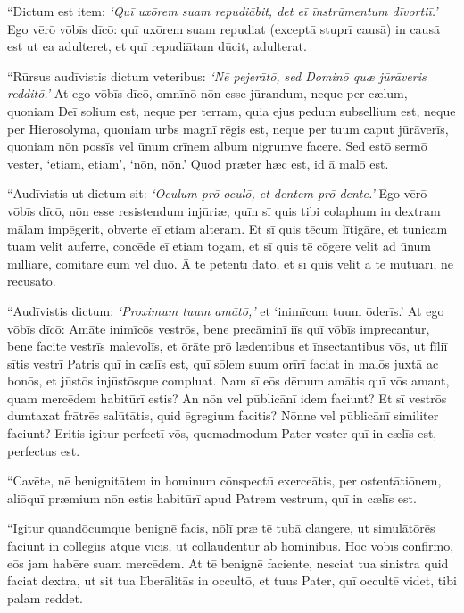 \Versus ``Dictum est item: \emph{`Quī uxōrem suam repudiābit, det eī īnstrūmentum dīvortiī.'}
\Versus Ego vērō vōbīs dīcō: quī uxōrem suam repudiat (exceptā stuprī causā) in causā est ut ea adulteret, et quī repudiātam dūcit, adulterat.

\Versus ``Rūrsus audīvistis dictum veteribus: \emph{`Nē pejerātō, sed Dominō quæ jūrāveris redditō.'}
\Versus At ego vōbīs dīcō, omnīnō nōn esse jūrandum, neque per cælum, quoniam Deī solium est,
\Versus neque per terram, quia ejus pedum subsellium est, neque per Hierosolyma, quoniam urbs magnī rēgis est,
\Versus neque per tuum caput jūrāverīs, quoniam nōn possīs vel ūnum crīnem album nigrumve facere.
\Versus Sed estō sermō vester, `etiam, etiam', `nōn, nōn.' Quod præter hæc est, id ā malō est.

\Versus ``Audīvistis ut dictum sit: \emph{`Oculum prō oculō, et dentem prō dente.'} 
\Versus Ego vērō vōbīs dīcō, nōn esse resistendum injūriæ, quīn sī quis tibi colaphum in dextram mālam impēgerit, obverte eī etiam alteram.
\Versus Et sī quis tēcum lītigāre, et tunicam tuam velit auferre, concēde eī etiam togam,
\Versus et sī quis tē cōgere velit ad ūnum mīlliāre, comitāre eum vel duo.
\Versus Ā tē petentī datō, et sī quis velit ā tē mūtuārī, nē recūsātō.

\Versus ``Audīvistis dictum: \emph{`Proximum tuum amātō,'} et `inimīcum tuum ōderīs.'
\Versus At ego vōbīs dīcō: Amāte inimīcōs vestrōs, bene precāminī iīs quī vōbīs imprecantur, bene facite vestrīs malevolīs, et ōrāte prō lædentibus et īnsectantibus vōs,
\Versus ut fīliī sītis vestrī Patris quī in cælīs est, quī sōlem suum orīrī faciat in malōs juxtā ac bonōs, et jūstōs injūstōsque compluat. 
\Versus Nam sī eōs dēmum amātis quī vōs amant, quam mercēdem habitūrī estis? An nōn vel pūblicānī idem faciunt? 
\Versus Et sī vestrōs dumtaxat frātrēs salūtātis, quid ēgregium facitis? Nōnne vel pūblicānī similiter faciunt? 
\Versus Eritis igitur perfectī vōs, quemadmodum Pater vester quī in cælīs est, perfectus est. 


\Caput
\Versus ``Cavēte, nē benignitātem in hominum cōnspectū exerceātis, per ostentātiōnem, aliōquī præmium nōn estis habitūrī apud Patrem vestrum, quī in cælīs est.

\Versus ``Igitur quandōcumque benignē facis, nōlī præ tē tubā clangere, ut simulātōrēs faciunt in collēgiīs atque vīcīs, ut collaudentur ab hominibus. Hoc vōbīs cōnfirmō, eōs jam habēre suam mercēdem. 
\Versus At tē benignē faciente, nesciat tua sinistra quid faciat dextra, 
\Versus ut sit tua līberālitās in occultō, et tuus Pater, quī occultē videt, tibi palam reddet.

